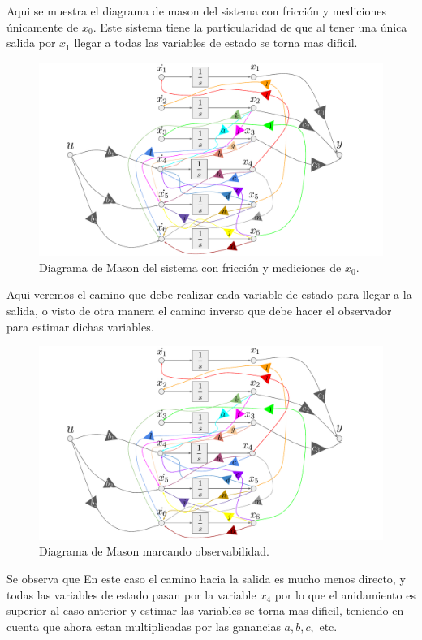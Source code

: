 Aqui se muestra el diagrama de mason del sistema con fricción y mediciones únicamente de $x_0$. Este sistema tiene la particularidad de que al tener una única salida por $x_1$ llegar a todas las variables de estado se torna mas dificil.
\begin{figure}[H]
	\centering
	\includegraphics[width=1\linewidth,page = 4]{../Modelo Teorico/ImagenesModelo Teorico/Mason.pdf}
	\caption{Diagrama de Mason del sistema con fricción y mediciones de $x_0$.}	
	\label{fig:masonsisfyxom}
\end{figure}
Aqui veremos el camino que debe realizar cada variable de estado para llegar a la salida, o visto de otra manera el camino inverso que debe hacer el observador para estimar dichas variables.
\begin{figure}[H]
	\centering
	\includegraphics[width=1.2\linewidth,page = 5]{../Modelo Teorico/ImagenesModelo Teorico/Mason.pdf}
	\caption{Diagrama de Mason marcando observabilidad.}	
	\label{fig:masonsisfyxomO}
\end{figure}
Se observa que En este caso el camino hacia la salida es mucho menos directo, y todas las variables de estado pasan por la variable $x_4$ por lo que el anidamiento es superior al caso anterior y estimar las variables se torna mas dificil, teniendo en cuenta que ahora estan multiplicadas por las ganancias $a,b,c,$ etc.
